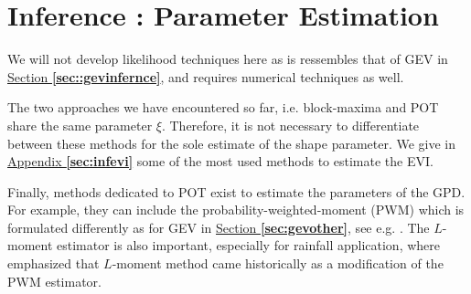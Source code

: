 \section{Inference : Parameter Estimation}\label{sec::potinfernce} 

We will not develop likelihood techniques here as is ressembles that of GEV in \hyperref[sec::gevinfernce]{Section \textbf{\ref{sec::gevinfernce}}}, and requires numerical techniques as well. 


The two approaches we have encountered so far, i.e. block-maxima and POT share the same parameter $\xi$. Therefore, it is not necessary to differentiate between these methods for the sole estimate of the shape parameter. We give in \hyperref[sec:infevi]{Appendix \textbf{\ref{sec:infevi}}} some of the most used methods to estimate the EVI.

Finally, methods dedicated to POT exist to estimate the parameters of the GPD. For example, they can include the probability-weighted-moment (PWM) which is formulated differently as for GEV in \hyperref[sec:gevother]{Section \textbf{\ref{sec:gevother}}}, see e.g. 
\citet{ribereau_skew_2016}. The $L$-moment estimator is also important, especially for rainfall application, where \cite{hosking_regional_1997} emphasized that $L$-moment method came historically as a modification of the PWM estimator.



